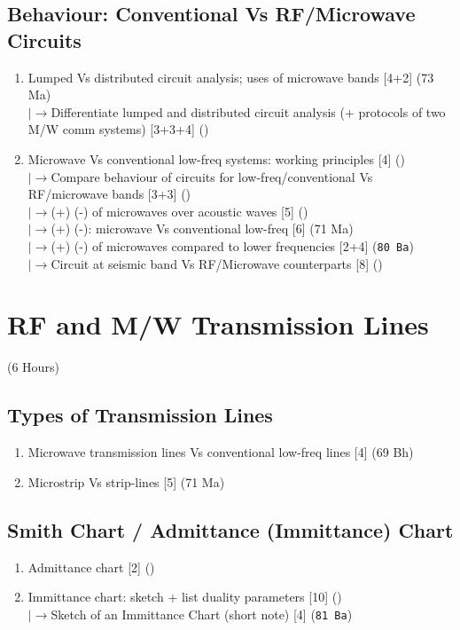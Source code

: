 \documentclass[12pt]{article}
\newcommand{\lb}{\\$\left|\rightarrow\right.$}
\begin{document}
  \subsection{Behaviour: Conventional Vs RF/Microwave Circuits}
    \begin{enumerate}[topsep=0pt, noitemsep]
      \item Lumped Vs distributed circuit analysis; uses of microwave bands \hfill [4+2] (73 Ma)
        \lb Differentiate lumped and distributed circuit analysis (+ protocols of two M/W comm systems) \hfill [3+3+4] ()
      \item Microwave Vs conventional low-freq systems: working principles \hfill [4] ()
        \lb Compare behaviour of circuits for low-freq/conventional Vs RF/microwave bands \hfill [3+3] ()
        \lb (+) (-) of microwaves over acoustic waves \hfill [5] ()
        \lb (+) (-): microwave Vs conventional low-freq \hfill [6] (71 Ma)
        \lb (+) (-) of microwaves compared to lower frequencies \hfill [2+4] (\texttt{80 Ba})
        \lb Circuit at seismic band Vs RF/Microwave counterparts \hfill [8] ()
    \end{enumerate}

\pagebreak
\section{RF and M/W Transmission Lines}
\begin{center}(6 Hours)\end{center}

  \subsection{Types of Transmission Lines}
    \begin{enumerate}[topsep=0pt, noitemsep]
      \item Microwave transmission lines Vs conventional low-freq lines \hfill [4] (69 Bh)
      \item Microstrip Vs strip-lines \hfill [5] (71 Ma)
    \end{enumerate}

  \subsection{Smith Chart / Admittance (Immittance) Chart}
    \begin{enumerate}[topsep=0pt, noitemsep]
      \item Admittance chart \hfill [2] ()
      \item Immittance chart: sketch + list duality parameters \hfill [10] ()
        \lb Sketch of an Immittance Chart (short note) \hfill [4] (\texttt{81 Ba})
    \end{enumerate}
\end{document}
